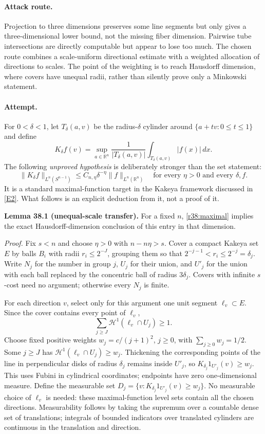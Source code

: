 \documentclass[11pt,a4paper]{article}
\newcommand{\R}{\mathbb{R}}
\newcommand{\eref}[2]{\hyperlink{extra:#1:#2}{[E#2]}}
\numberwithin{equation}{section}
\begin{document}
\paragraph{Attack route.}
Projection to three dimensions preserves some line segments but only gives
a three-dimensional lower bound, not the missing fiber dimension. Pairwise
tube intersections are directly computable but appear to lose too much.
The chosen route combines a scale-uniform directional estimate with a
weighted allocation of directions to scales. The point of the weighting is
to reach Hausdorff dimension, where covers have unequal radii, rather than
silently prove only a Minkowski statement.

\paragraph{Attempt.}
For $0<\delta<1$, let $T_\delta(a,v)$ be the radius-$\delta$ cylinder around
$\{a+tv:0\le t\le1\}$ and define
\[
 K_\delta f(v)=\sup_{a\in\R^n}\frac1{|T_\delta(a,v)|}
                      \int_{T_\delta(a,v)}|f(x)|\,dx.
\]
The following \emph{unproved hypothesis} is deliberately stronger than the
set statement:
\begin{equation}\label{r38:maximal}
 \|K_\delta f\|_{L^n(S^{n-1})}
 \le C_{n,\eta}\delta^{-\eta}\|f\|_{L^n(\R^n)}
 \quad\text{for every }\eta>0\text{ and every }\delta,f.
\end{equation}
It is a standard maximal-function target in the Kakeya framework discussed
in \eref{38}{2}. What follows is an explicit deduction from it, not a proof
of it.

\textbf{Lemma 38.1 (unequal-scale transfer).}
For a fixed $n$, \eqref{r38:maximal} implies the exact Hausdorff-dimension
conclusion of this entry in that dimension.

\emph{Proof.}
Fix $s<n$ and choose $\eta>0$ with $n-n\eta>s$. Cover a compact Kakeya set
$E$ by balls $B_i$ with radii $r_i\le2^{-J}$, grouping them so that
$2^{-j-1}<r_i\le2^{-j}=\delta_j$. Write $N_j$ for the number in group $j$,
$U_j$ for their union, and $U'_j$ for the union with each ball replaced by
the concentric ball of radius $3\delta_j$. Covers with infinite $s$-cost
need no argument; otherwise every $N_j$ is finite.

For each direction $v$, select only for this argument one unit segment
$\ell_v\subset E$. Since the cover contains every point of $\ell_v$,
\[
 \sum_{j\ge J}\mathcal H^1(\ell_v\cap U_j)\ge1.
\]
Choose fixed positive weights $w_j=c/(j+1)^2$, $j\ge0$, with
$\sum_{j\ge0}w_j=1/2$. Some $j\ge J$ has
$\mathcal H^1(\ell_v\cap U_j)\ge w_j$. Thickening the corresponding points
of the line in perpendicular disks of radius $\delta_j$ remains inside
$U'_j$, so $K_{\delta_j}1_{U'_j}(v)\ge w_j$. This uses Fubini in cylindrical
coordinates; endpoints have zero one-dimensional measure.
Define the measurable set
$D_j=\{v:K_{\delta_j}1_{U'_j}(v)\ge w_j\}$. No measurable choice of
$\ell_v$ is needed: these maximal-function level sets contain all the chosen
directions. Measurability follows by taking the supremum over a countable
dense set of translations; integrals of bounded indicators over translated
cylinders are continuous in the translation and direction.
\end{document}
